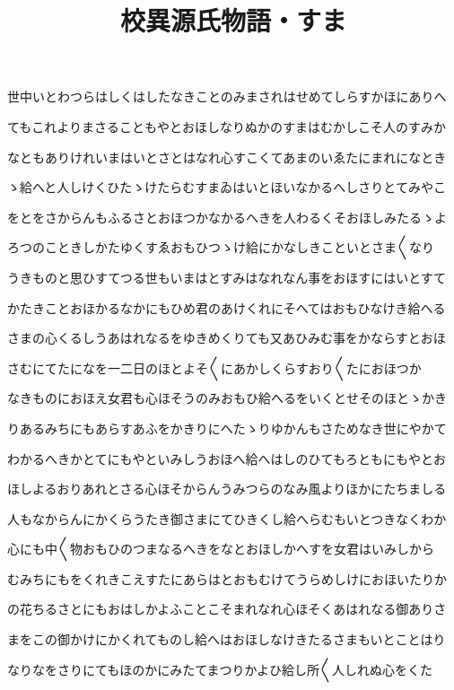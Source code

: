 \documentclass[a4paper,11pt,landscape]{ltjtarticle}
\title{校異源氏物語・すま}
\date{}
\begin{document}
\maketitle

世中いとわつらはしくはしたなきことのみまされはせめてしらすかほにありへ
\par\medskip
てもこれよりまさることもやとおほしなりぬかのすまはむかしこそ人のすみか
\par\medskip
なともありけれいまはいとさとはなれ心すこくてあまのいゑたにまれになとき
\par\medskip
ゝ給へと人しけくひたゝけたらむすまゐはいとほいなかるへしさりとてみやこ
\par\medskip
をとをさからんもふるさとおほつかなかるへきを人わるくそおほしみたるゝよ
\par\medskip
ろつのこときしかたゆくすゑおもひつゝけ給にかなしきこといとさま〱なり
\par\medskip
うきものと思ひすてつる世もいまはとすみはなれなん事をおほすにはいとすて
\par\medskip
かたきことおほかるなかにもひめ君のあけくれにそへてはおもひなけき給へる
\par\medskip
さまの心くるしうあはれなるをゆきめくりても又あひみむ事をかならすとおほ
\par\medskip
さむにてたになを一二日のほとよそ〱にあかしくらすおり〱たにおほつか
\par\medskip
なきものにおほえ女君も心ほそうのみおもひ給へるをいくとせそのほとゝかき
\par\medskip
りあるみちにもあらすあふをかきりにへたゝりゆかんもさためなき世にやかて
\par\medskip
わかるへきかとてにもやといみしうおほへ給へはしのひてもろともにもやとお
\par\medskip
ほしよるおりあれとさる心ほそからんうみつらのなみ風よりほかにたちましる
\par\medskip
人もなからんにかくらうたき御さまにてひきくし給へらむもいとつきなくわか
\par\medskip
心にも中〱物おもひのつまなるへきをなとおほしかへすを女君はいみしから
\par\medskip
むみちにもをくれきこえすたにあらはとおもむけてうらめしけにおほいたりか
\par\medskip
の花ちるさとにもおはしかよふことこそまれなれ心ほそくあはれなる御ありさ
\par\medskip
まをこの御かけにかくれてものし給へはおほしなけきたるさまもいとことはり
\par\medskip
なりなをさりにてもほのかにみたてまつりかよひ給し所〱人しれぬ心をくた
\end{document}
